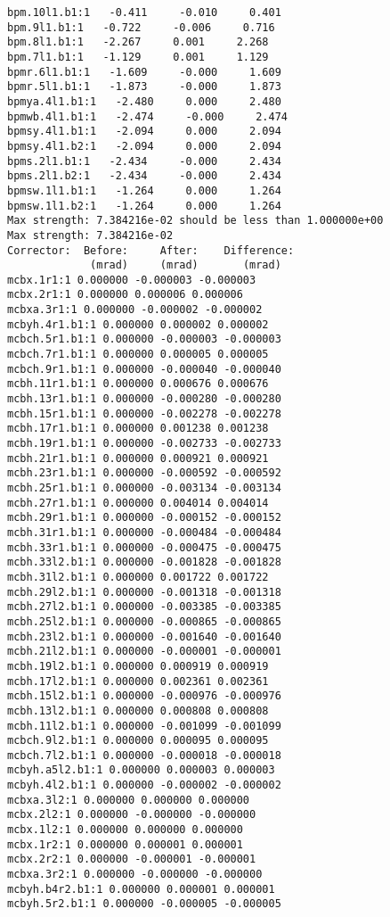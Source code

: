 \begin{verbatim}
bpm.10l1.b1:1   -0.411     -0.010     0.401
bpm.9l1.b1:1   -0.722     -0.006     0.716
bpm.8l1.b1:1   -2.267     0.001     2.268
bpm.7l1.b1:1   -1.129     0.001     1.129
bpmr.6l1.b1:1   -1.609     -0.000     1.609
bpmr.5l1.b1:1   -1.873     -0.000     1.873
bpmya.4l1.b1:1   -2.480     0.000     2.480
bpmwb.4l1.b1:1   -2.474     -0.000     2.474
bpmsy.4l1.b1:1   -2.094     0.000     2.094
bpmsy.4l1.b2:1   -2.094     0.000     2.094
bpms.2l1.b1:1   -2.434     -0.000     2.434
bpms.2l1.b2:1   -2.434     -0.000     2.434
bpmsw.1l1.b1:1   -1.264     0.000     1.264
bpmsw.1l1.b2:1   -1.264     0.000     1.264
Max strength: 7.384216e-02 should be less than 1.000000e+00
Max strength: 7.384216e-02
Corrector:  Before:     After:    Difference:
             (mrad)     (mrad)       (mrad)  
mcbx.1r1:1 0.000000 -0.000003 -0.000003
mcbx.2r1:1 0.000000 0.000006 0.000006
mcbxa.3r1:1 0.000000 -0.000002 -0.000002
mcbyh.4r1.b1:1 0.000000 0.000002 0.000002
mcbch.5r1.b1:1 0.000000 -0.000003 -0.000003
mcbch.7r1.b1:1 0.000000 0.000005 0.000005
mcbch.9r1.b1:1 0.000000 -0.000040 -0.000040
mcbh.11r1.b1:1 0.000000 0.000676 0.000676
mcbh.13r1.b1:1 0.000000 -0.000280 -0.000280
mcbh.15r1.b1:1 0.000000 -0.002278 -0.002278
mcbh.17r1.b1:1 0.000000 0.001238 0.001238
mcbh.19r1.b1:1 0.000000 -0.002733 -0.002733
mcbh.21r1.b1:1 0.000000 0.000921 0.000921
mcbh.23r1.b1:1 0.000000 -0.000592 -0.000592
mcbh.25r1.b1:1 0.000000 -0.003134 -0.003134
mcbh.27r1.b1:1 0.000000 0.004014 0.004014
mcbh.29r1.b1:1 0.000000 -0.000152 -0.000152
mcbh.31r1.b1:1 0.000000 -0.000484 -0.000484
mcbh.33r1.b1:1 0.000000 -0.000475 -0.000475
mcbh.33l2.b1:1 0.000000 -0.001828 -0.001828
mcbh.31l2.b1:1 0.000000 0.001722 0.001722
mcbh.29l2.b1:1 0.000000 -0.001318 -0.001318
mcbh.27l2.b1:1 0.000000 -0.003385 -0.003385
mcbh.25l2.b1:1 0.000000 -0.000865 -0.000865
mcbh.23l2.b1:1 0.000000 -0.001640 -0.001640
mcbh.21l2.b1:1 0.000000 -0.000001 -0.000001
mcbh.19l2.b1:1 0.000000 0.000919 0.000919
mcbh.17l2.b1:1 0.000000 0.002361 0.002361
mcbh.15l2.b1:1 0.000000 -0.000976 -0.000976
mcbh.13l2.b1:1 0.000000 0.000808 0.000808
mcbh.11l2.b1:1 0.000000 -0.001099 -0.001099
mcbch.9l2.b1:1 0.000000 0.000095 0.000095
mcbch.7l2.b1:1 0.000000 -0.000018 -0.000018
mcbyh.a5l2.b1:1 0.000000 0.000003 0.000003
mcbyh.4l2.b1:1 0.000000 -0.000002 -0.000002
mcbxa.3l2:1 0.000000 0.000000 0.000000
mcbx.2l2:1 0.000000 -0.000000 -0.000000
mcbx.1l2:1 0.000000 0.000000 0.000000
mcbx.1r2:1 0.000000 0.000001 0.000001
mcbx.2r2:1 0.000000 -0.000001 -0.000001
mcbxa.3r2:1 0.000000 -0.000000 -0.000000
mcbyh.b4r2.b1:1 0.000000 0.000001 0.000001
mcbyh.5r2.b1:1 0.000000 -0.000005 -0.000005

\end{verbatim}
